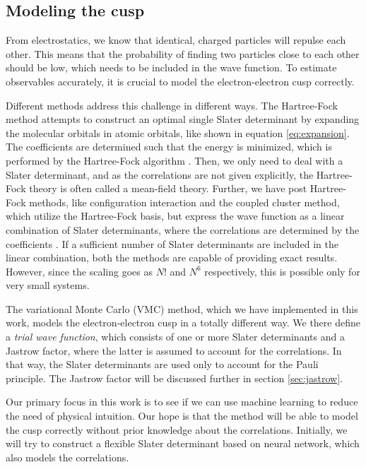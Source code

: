 \subsection{Modeling the cusp} \label{sec:cusp}
From electrostatics, we know that identical, charged particles will repulse each other. This means that the probability of finding two particles close to each other should be low, which needs to be included in the wave function. To estimate observables accurately, it is crucial to model the electron-electron cusp correctly.

Different methods address this challenge in different ways. The Hartree-Fock method attempts to construct an optimal single Slater determinant by expanding the molecular orbitals in atomic orbitals, like shown in equation \eqref{eq:expansion}. The coefficients are determined such that the energy is minimized, which is performed by the Hartree-Fock algorithm \supercite{hartree_wave_1928, fock_selfconsistent_1930}. Then, we only need to deal with a Slater determinant, and as the correlations are not given explicitly, the Hartree-Fock theory is often called a mean-field theory. Further, we have post Hartree-Fock methods, like configuration interaction and the coupled cluster method, which utilize the Hartree-Fock basis, but express the wave function as a linear combination of Slater determinants, where the correlations are determined by the coefficients \supercite{daniel_crawford_introduction_2007}. If a sufficient number of Slater determinants are included in the linear combination, both the methods are capable of providing exact results. However, since the scaling goes as $N!$ and $N^6$ respectively, this is possible only for very small systems.

The variational Monte Carlo (VMC) method, which we have implemented in this work, models the electron-electron cusp in a totally different way. We there define a \textit{trial wave function}, which consists of one or more Slater determinants and a Jastrow factor, where the latter is assumed to account for the correlations. In that way, the Slater determinants are used only to account for the Pauli principle. The Jastrow factor will be discussed further in section \ref{sec:jastrow}.

Our primary focus in this work is to see if we can use machine learning to reduce the need of physical intuition. Our hope is that the method will be able to model the cusp correctly without prior knowledge about the correlations. Initially, we will try to construct a flexible Slater determinant based on neural network, which also models the correlations.

